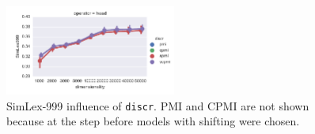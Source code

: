 \begin{figure}[h]
  \centering

  \includegraphics[width=0.5\textwidth]{supplement/figures/SimLex999-interaction-discr}

  \caption{SimLex-999 influence of \texttt{discr}. PMI and CPMI are not shown because at the step before models with shifting were chosen.}
  \label{fig:SimLex999-discr}
\end{figure}
